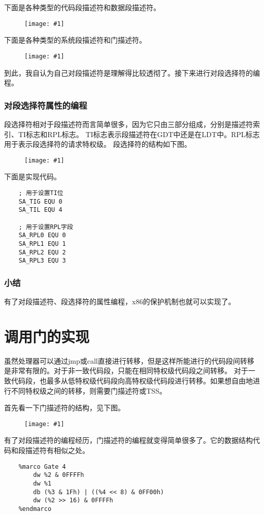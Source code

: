 \documentclass[a4paper,left=2.5cm,right=2.5cm,11pt]{article}
\newcommand{\fic}[1]{\begin{figure}[H]
		\center
		\texttt{[image: \#1]}
	\end{figure}}
\begin{document}
	下面是各种类型的代码段描述符和数据段描述符。
	\fic{3.png}

	\clearpage

	下面是各种类型的系统段描述符和门描述符。
	\fic{4.png}

	到此，我自认为自己对段描述符是理解得比较透彻了。接下来进行对段选择符的编程。

\subsubsection{对段选择符属性的编程}
	段选择符相对于段描述符而言简单很多，因为它只由三部分组成，分别是描述符索引、TI标志和RPL标志。
	TI标志表示段描述符在GDT中还是在LDT中。RPL标志用于表示段选择符的请求特权级。
	段选择符的结构如下图。
	\fic{5.png}

	下面是实现代码。
	\begin{lstlisting}
	; 用于设置TI位
	SA_TIG EQU 0
	SA_TIL EQU 4

	; 用于设置RPL字段
	SA_RPL0 EQU 0
	SA_RPL1 EQU 1
	SA_RPL2 EQU 2
	SA_RPL3 EQU 3
	\end{lstlisting}

\subsubsection{小结}
	有了对段描述符、段选择符的属性编程，x86的保护机制也就可以实现了。

\clearpage

\section{调用门的实现}
	虽然处理器可以通过jmp或call直接进行转移，但是这样所能进行的代码段间转移是非常有限的。对于非一致代码段，只能在相同特权级代码段之间转移。
	对于一致代码段，也最多从低特权级代码段向高特权级代码段进行转移。如果想自由地进行不同特权级之间的转移，则需要门描述符或TSS。\par
	首先看一下门描述符的结构，见下图。
	\fic{6.png}

	有了对段描述符的编程经历，门描述符的编程就变得简单很多了。它的数据结构代码和段描述符有相似之处。
	\begin{lstlisting}
	%marco Gate 4
		dw %2 & 0FFFFh
		dw %1
		db (%3 & 1Fh) | ((%4 << 8) & 0FF00h)
		dw (%2 >> 16) & 0FFFFh
	%endmarco
	\end{lstlisting}
\end{document}
